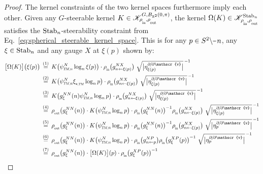\begin{proof}
    The kernel constraints of the two kernel spaces furthermore imply each other.
    Given any $G$-steerable kernel $K \in \mathscr{K}^{G,B_{\R^2}\mkern-1mu(0,\pi)}_{\rhoin\mkern-1mu,\rhoout}$, the kernel $\Omega(K) \in \mathscr{K}^{\Stab{n}}_{\rhoin\mkern-1mu,\rhoout}$ satisfies the $\operatorname{Stab}_{n}$-steerability constraint from Eq.~\eqref{eq:spherical_steerable_kernel_space}.
    This is for any $p\in S^2 \backslash \mkern-1mu\minus\mkern1mu n$, any $\xi \in \operatorname{Stab}_{n}$ and any gauge $X$ at $\xi(p)$ shown by:
    \begin{align}
        \big[\Omega(K)\big]\big( \xi(p) \big)
        \,&\overset{(1)}{=}\, K\big( \psiTMn^N \log_n \xi(p) \big) \cdot \rhoin\big( g_{n\leftarrow\xi(p)}^{NX} \big) 
               \ \sqrt{\big|\eta_{\xi(p)}^{\partial\mkern-2mu/\mkern-2mu\partial\mathscr{v}}\big|}^{\,-1} \notag \\
        \,&\overset{(2)}{=}\, K\big( \psiTMn^N \dxiTM \log_n p \big) \cdot \rhoin\big( g_{n\leftarrow\xi(p)}^{NX} \big) 
               \ \sqrt{\big|\eta_{\xi(p)}^{\partial\mkern-2mu/\mkern-2mu\partial\mathscr{v}}\big|}^{\,-1} \notag \\
        \,&\overset{(3)}{=}\, K\big( g_\xi^{NN}(n) \psiTMn^N \log_n p \big) \cdot \rhoin\big( g_{n\leftarrow\xi(p)}^{NX} \big) 
               \ \sqrt{\big|\eta_{\xi(p)}^{\partial\mkern-2mu/\mkern-2mu\partial\mathscr{v}}\big|}^{\,-1} \notag \\
        \,&\overset{(4)}{=}\, \rhoout\big( g_\xi^{NN}(n) \big) \cdot K\big(\psiTMn^N \log_n p \big) \cdot \rhoin\big( g_\xi^{NN}(n) \big)^{-1} \rhoin\big( g_{n\leftarrow\xi(p)}^{NX} \big) 
               \ \sqrt{\big|\eta_{\xi(p)}^{\partial\mkern-2mu/\mkern-2mu\partial\mathscr{v}}\big|}^{\,-1} \notag \\
        \,&\overset{(5)}{=}\, \rhoout\big( g_\xi^{NN}(n) \big) \cdot K\big(\psiTMn^N \log_n p \big) \cdot \rhoin\big( g_\xi^{NN}(n) \big)^{-1} \rhoin\big( g_{n\leftarrow\xi(p)}^{NX} \big)
               \ \sqrt{\big|\eta_p^{\partial\mkern-2mu/\mkern-2mu\partial\mathscr{v}}\big|}^{\,-1} \notag \\
        \,&\overset{(6)}{=}\, \rhoout\big( g_\xi^{NN}(n) \big) \cdot K\big(\psiTMn^N \log_n p \big) \cdot \rhoin\big( g_{n\leftarrow p}^{NP} \big) \rhoin\big( g_\xi^{XP}(p) \big)^{-1} 
               \ \sqrt{\big|\eta_p^{\partial\mkern-2mu/\mkern-2mu\partial\mathscr{v}}\big|}^{\,-1} \notag \\
        \,&\overset{(7)}{=}\, \rhoout\big( g_\xi^{NN}(n) \big) \cdot \big[\Omega(K)\big](p) \cdot \rhoin\big( g_\xi^{XP}(p) \big)^{-1}

\end{align}
\end{proof}
